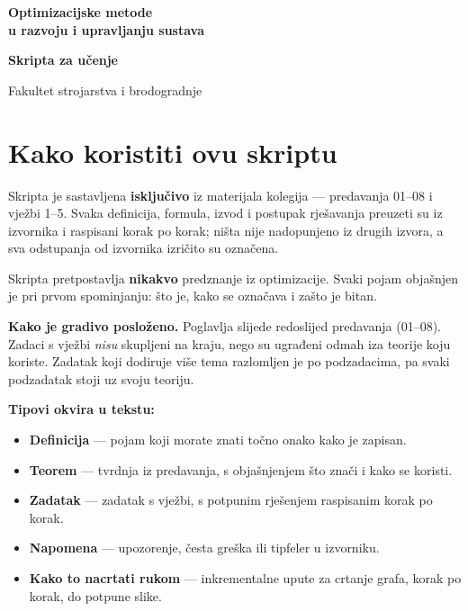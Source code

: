 \documentclass[11pt,a4paper,oneside]{report}
\begin{document}
\begin{titlepage}
\centering
\vspace*{5cm}

{\Huge\bfseries\color{fsbcrvena} Optimizacijske metode\\[0.3cm]
u razvoju i upravljanju sustava\par}

\vspace{1.5cm}
{\LARGE\bfseries Skripta za učenje\par}

\vspace{1.5cm}
{\large Fakultet strojarstva i brodogradnje\par}

\vfill
\end{titlepage}

\chapter*{Kako koristiti ovu skriptu}

Skripta je sastavljena \textbf{isključivo} iz materijala kolegija --- predavanja
01--08 i vježbi 1--5. Svaka definicija, formula, izvod i postupak rješavanja
preuzeti su iz izvornika i raspisani korak po korak; ništa nije nadopunjeno iz
drugih izvora, a sva odstupanja od izvornika izričito su označena.

Skripta pretpostavlja \textbf{nikakvo} predznanje iz optimizacije. Svaki pojam
objašnjen je pri prvom spominjanju: što je, kako se označava i zašto je bitan.

\textbf{Kako je gradivo posloženo.} Poglavlja slijede redoslijed predavanja
(01--08). Zadaci s vježbi \emph{nisu} skupljeni na kraju, nego su ugrađeni
odmah iza teorije koju koriste. Zadatak koji dodiruje više tema razlomljen je
po podzadacima, pa svaki podzadatak stoji uz svoju teoriju.

\textbf{Tipovi okvira u tekstu:}

\begin{itemize}
  \item \textcolor{tamnoplava}{\textbf{Definicija}} --- pojam koji morate znati
        točno onako kako je zapisan.
  \item \textcolor{fsbcrvena}{\textbf{Teorem}} --- tvrdnja iz predavanja, s
        objašnjenjem što znači i kako se koristi.
  \item \textcolor{zelena}{\textbf{Zadatak}} --- zadatak s vježbi, s potpunim
        rješenjem raspisanim korak po korak.
  \item \textcolor{narancasta}{\textbf{Napomena}} --- upozorenje, česta greška
        ili tipfeler u izvorniku.
  \item \textbf{Kako to nacrtati rukom} --- inkrementalne upute za crtanje
        grafa, korak po korak, do potpune slike.
\end{itemize}
\end{document}
